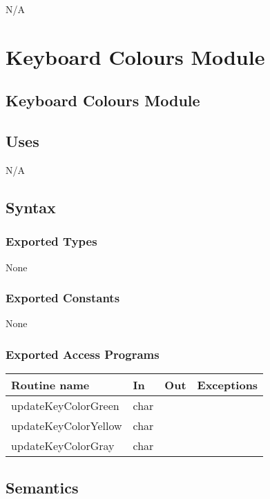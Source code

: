 \documentclass[12pt]{article}
\begin{document}
N/A

\newpage

\section {Keyboard Colours Module}

\subsection* {Keyboard Colours Module}

\subsection* {Uses}

N/A

\subsection* {Syntax}

\subsubsection* {Exported Types}

None

\subsubsection* {Exported Constants}

None

\subsubsection* {Exported Access Programs}

\begin{tabular}{| l | l | l | p{6cm} |}
\hline
\textbf{Routine name} & \textbf{In} & \textbf{Out} & \textbf{Exceptions}\\
\hline
updateKeyColorGreen & char & ~ &  \\
\hline
updateKeyColorYellow & char & ~ &  \\
\hline
updateKeyColorGray & char & ~ &  \\
\hline
\end{tabular}

\subsection* {Semantics}
\end{document}
